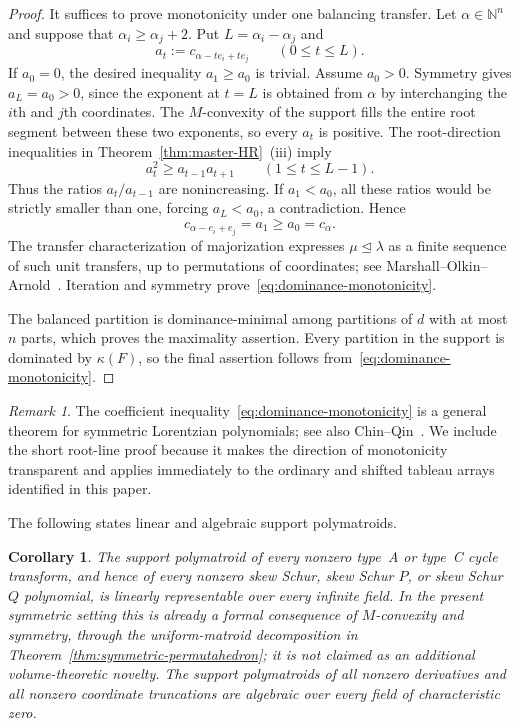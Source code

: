 \documentclass[11pt,a4paper,oneside]{amsart}
\numberwithin{equation}{section}
\newtheorem{corollary}[theorem]{Corollary}
\theoremstyle{definition}
\theoremstyle{remark}
\newtheorem{remark}[theorem]{Remark}
\newcommand{\N}{\mathbb N}
\begin{document}
\begin{proof}
It suffices to prove monotonicity under one balancing transfer.  Let
$\alpha\in\N^n$ and suppose that $\alpha_i\geq\alpha_j+2$.  Put
$L=\alpha_i-\alpha_j$ and
\[
 a_t:=c_{\alpha-t e_i+t e_j}
 \qquad(0\leq t\leq L).
\]
If $a_0=0$, the desired inequality $a_1\geq a_0$ is trivial.  Assume $a_0>0$.  Symmetry gives $a_L=a_0>0$, since the exponent at $t=L$ is obtained from $\alpha$ by interchanging the $i$th and $j$th coordinates.  The $M$-convexity of the support fills the entire root segment between these two exponents, so every $a_t$ is positive.  The root-direction inequalities in Theorem~\ref{thm:master-HR}~\textup{(iii)} imply
\[
 a_t^2\geq a_{t-1}a_{t+1}
 \qquad(1\leq t\leq L-1).
\]
Thus the ratios $a_t/a_{t-1}$ are nonincreasing.  If $a_1<a_0$, all these ratios would be strictly smaller than one, forcing $a_L<a_0$, a contradiction.  Hence
\[
 c_{\alpha-e_i+e_j}=a_1\geq a_0=c_\alpha.
\]
The transfer characterization of majorization expresses $\mu\unlhd\lambda$ as a finite sequence of such unit transfers, up to permutations of coordinates; see Marshall--Olkin--Arnold~\cite[Chapter~2, Section~B]{MarshallOlkinArnold11}.  Iteration and symmetry prove~\eqref{eq:dominance-monotonicity}.

The balanced partition is dominance-minimal among partitions of $d$ with at most $n$ parts, which proves the maximality assertion.  Every partition in the support is dominated by $\kappa(F)$, so the final assertion follows from~\eqref{eq:dominance-monotonicity}.
\end{proof}

\begin{remark}
The coefficient inequality~\eqref{eq:dominance-monotonicity} is a general theorem for symmetric Lorentzian polynomials; see also Chin--Qin~\cite[Theorem~3.16]{ChinQin25}.  We include the short root-line proof because it makes the direction of monotonicity transparent and applies immediately to the ordinary and shifted tableau arrays identified in this paper.
\end{remark}

The following states linear and algebraic support polymatroids.

\begin{corollary}\label{cor:algebraic-polymatroid}
The support polymatroid of every nonzero type~A or type~C cycle transform, and hence of every nonzero skew Schur, skew Schur $P$, or skew Schur $Q$ polynomial, is linearly representable over every infinite field.  In the present symmetric setting this is already a formal consequence of $M$-convexity and symmetry, through the uniform-matroid decomposition in Theorem~\ref{thm:symmetric-permutahedron}; it is not claimed as an additional volume-theoretic novelty.  The support polymatroids of all nonzero derivatives and all nonzero coordinate truncations are algebraic over every field of characteristic zero.
\end{corollary}
\end{document}
